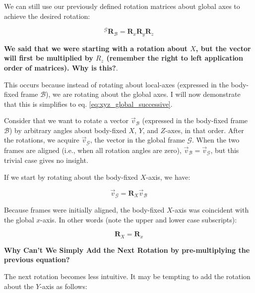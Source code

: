 \documentclass{article}
\begin{document}
We can still use our previously defined rotation matrices about global axes to achieve the desired rotation:

\begin{equation}
{}^{\mathcal{G}} \mathbf{R}_{\mathcal{B}} = \mathbf{R}_x \mathbf{R}_y \mathbf{R}_z
\label{eq:xyz_global_successive}
\end{equation}

\textbf{We said that we were starting with a rotation about \(X \), but the vector will first be multiplied by \(R_z\) (remember the right to left application order of matrices). Why is this?}. 

This occurs because instead of rotating about local-axes (expressed in the body-fixed frame \( \mathcal{B} \)), we are rotating about the global axes. I will now demonstrate that this is simplifies to eq. \ref{eq:xyz_global_successive}.


Consider that we want to rotate a vector \( \vec{v}_{\mathcal{B}} \) (expressed in the body-fixed frame \( \mathcal{B} \)) by arbitrary angles about body-fixed \( X\), \(Y\), and \(Z\)-axes, in that order. After the rotations, we acquire \( \vec{v}_{\mathcal{G}} \), the vector in the global frame \( \mathcal{G} \). 
When the two frames are aligned (i.e., when all rotation angles are zero), \( \vec{v}_{\mathcal{B}} = \vec{v}_{\mathcal{G}} \), but this trivial case gives no insight.

If we start by rotating about the body-fixed \(X\)-axis, we have:

\begin{equation}
\vec{v}_{\mathcal{G}} = \mathbf{R}_X \vec{v}_{\mathcal{B}}
\end{equation}

Because frames were initially aligned, the body-fixed \( X\)-axis was coincident with the global \( x\)-axis. In other words (note the upper and lower case subscripts):

\begin{equation}
    \mathbf{R}_X = \mathbf{R}_x
    \label{eq:locglobRx}
\end{equation}
    

\textbf{Why Can't We Simply Add the Next Rotation by pre-multiplying the previous equation?}

The next rotation becomes less intuitive. It may be tempting to add the rotation about the \(Y\)-axis as follows:
\end{document}
